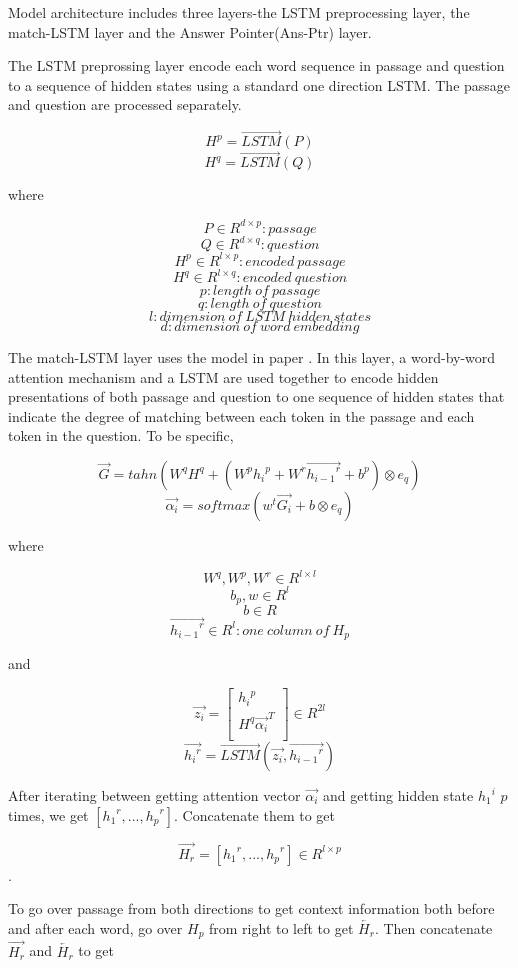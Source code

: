 \documentclass[12pt]{article}
\begin{document}
Model architecture includes three layers-the LSTM preprocessing layer, the match-LSTM layer and the Answer Pointer(Ans-Ptr) layer.

The LSTM preprossing layer encode each word sequence in passage and question to a sequence of hidden states using a standard one direction LSTM. The passage and question are processed separately.

$$H^p = \overrightarrow{LSTM}(P)$$
$$H^q = \overrightarrow{LSTM}(Q)$$

where

 $$P\in R^{d \times p}: passage$$
 $$Q\in R^{d \times q}: question$$
 $$H^p\in R^{l \times p}: encoded\ passage$$
 $$H^q\in R^{l \times q}: encoded\ question$$
 $$p: length \ of\ passage$$
 $$q: length\ of\ question$$
 $$l: dimension\ of\ LSTM\ hidden\ states$$
 $$d: dimension\ of\ word\ embedding$$

The match-LSTM layer uses the model in paper \cite{wang2015learning}. In this layer, a word-by-word attention mechanism and a LSTM are used together to encode hidden presentations of both passage and question to one sequence of hidden states that indicate the degree of matching between each token in the passage and each token in the question. To be specific,

$$\overrightarrow{G} = tahn(W^qH^q + (W^p{h_i}^p + W^r\overrightarrow{{h_{i-1}}^r} + b^p) \otimes e_q)$$
$$\overrightarrow{\alpha _i} = softmax(w^t\overrightarrow{G_i} + b \otimes e_q)$$


where

$$W^q, W^p, W^r\in R^{l \times l} $$
$$b_p, w\in R^{l}  $$
$$b \in R $$
$$\overrightarrow{{h_{i-1}}^r}\in R^{l}: one\ column\ of\ H_p  $$

and

\[ \overrightarrow{z_i} =
\begin{bmatrix}
{h_i}^p \\
H^q\overrightarrow{ {\alpha _i}}^T \\
\end{bmatrix}
\in R^{2l}
\]
$$\overrightarrow{{h_i}^r} = \overrightarrow{LSTM}(\overrightarrow{z_i}, \overrightarrow{{h_{i-1}}^r})$$

After iterating between getting attention vector $\overrightarrow{\alpha _i}$ and getting hidden state ${{h_{1}}^i}$ $p$ times, we get $[{{h_{1}}^r}, ..., {{h_{p}}^r}]$. Concatenate them to get

$$\overrightarrow{H_r} = [{{h_{1}}^r}, ..., {{h_{p}}^r}] \in R^{l \times p}$$.

To go over passage from both directions to get context information both before and after each word, go over $H_p$ from right to left to get $\overleftarrow{H_r}$. Then concatenate $\overrightarrow{H_r}$ and $\overleftarrow{H_r}$ to get
\end{document}
